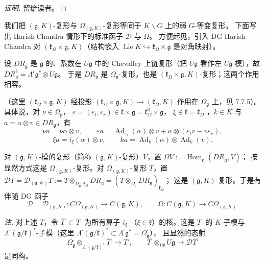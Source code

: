 \emph{证明.} 留给读者。\hfill$\Box$

 我们把 $(\mathfrak{g},K)$-复形与
$\Omega_{(\mathfrak{g},K)}$-复形等同于 $K\backslash G$ 上的弱 $G$-等变复形。
下面写出 Harish-Chandra 情形下的标准函子 $\mathcal{D}$ 与 $\Omega$。
方便起见，引入 DG Harish-Chandra 对
$(\mathfrak{k}_\Omega\times\mathfrak{g},K)$（结构嵌入
$\operatorname{Lie}K\hookrightarrow\mathfrak{k}_\Omega\times\mathfrak{g}$
是对角映射）。

设 $DR_{\mathfrak{g}}$ 是 $\mathfrak{g}$ 的、系数在 $U\mathfrak{g}$ 中的
Chevalley 上链复形（把 $U\mathfrak{g}$ 看作左 $U\mathfrak{g}$-模），故
$DR_{\mathfrak{g}}^i=\Lambda^i\mathfrak{g}^*\otimes U\mathfrak{g}$。
于是 $DR_{\mathfrak{g}}$ 是 $\Omega_{\mathfrak{g}}$-复形，也是
$(\mathfrak{k}_\Omega\times\mathfrak{g},K)$-复形；这两个作用相容。


（这里 $(\mathfrak{k}_\Omega\times\mathfrak{g},K)$ 经投影
$(\mathfrak{k}_\Omega\times\mathfrak{g},K)\to(\mathfrak{k}_\Omega,K)$
作用在 $\Omega_{\mathfrak{g}}$ 上，见 7.7.5）。具体说，对
$\nu\in\Omega_{\mathfrak{g}}$，
$\varepsilon=(\varepsilon_l,\varepsilon_r)\in\mathfrak{k}\times\mathfrak{g}
=\mathfrak{k}_\Omega^0\times\mathfrak{g}$，
$\xi\in\mathfrak{k}=\mathfrak{k}_\Omega^{-1}$，$k\in K$ 与
$a=\alpha\otimes v\in DR_{\mathfrak{g}}$，有
\[
\nu a=\nu\alpha\otimes v,\qquad
\varepsilon a=\operatorname{Ad}_{\varepsilon_l}(\alpha)\otimes v
+\alpha\otimes(\varepsilon_l v-v\varepsilon_r),
\]
\[
\xi a=i_\xi(\alpha)\otimes v,\qquad
ka=\operatorname{Ad}_k(\alpha)\otimes\operatorname{Ad}_k(v).
\]

对 $(\mathfrak{g},K)$-模的复形（简称 $(\mathfrak{g},K)$-复形）$V$，置
$\Omega V:=\operatorname{Hom}_{\mathfrak{g}}(DR_{\mathfrak{g}},V)$；
按显然方式这是 $\Omega_{(\mathfrak{g},K)}$-复形。对
$\Omega_{(\mathfrak{g},K)}$-复形 $T$，置
$\mathcal{D}T=\mathcal{D}_{(\mathfrak{g},K)}T:=
T\otimes_{\Omega_{\mathfrak{g}},\mathfrak{k}_\Omega}DR_{\mathfrak{g}}
=(T\otimes_{\Omega_{\mathfrak{g}}}DR_{\mathfrak{g}})_{\mathfrak{k}_\Omega}$；
这是 $(\mathfrak{g},K)$-复形。于是有伴随 DG 函子
\begin{equation}\tag{324}
\mathcal{D}=\mathcal{D}_{(\mathfrak{g},K)}:
C\Omega_{(\mathfrak{g},K)}\longrightarrow C(\mathfrak{g},K),\qquad
\Omega:C(\mathfrak{g},K)\longrightarrow C\Omega_{(\mathfrak{g},K)}.
\end{equation}

\emph{注.} 对上述 $T$，令
$\overline{T}^{\cdot}\subset T^{\cdot}$ 为所有算子 $i_\xi$
（$\xi\in\mathfrak{k}$）的核。这是 $T^{\cdot}$ 的 $K$-子模与
$\Lambda^{\cdot}(\mathfrak{g}/\mathfrak{k})^*$-子模（这里
$\Lambda^{\cdot}(\mathfrak{g}/\mathfrak{k})^*\subset
\Lambda^{\cdot}\mathfrak{g}^*=\Omega_{\mathfrak{g}}^{\cdot}$），
且显然的态射
\begin{equation}\tag{325}
\Omega_{\mathfrak{g}}^{\cdot}
\otimes_{\Lambda^{\cdot}(\mathfrak{g}/\mathfrak{k})^*}
\overline{T}^{\cdot}\longrightarrow T^{\cdot},\qquad
\overline{T}^{\cdot}\otimes_{U\mathfrak{k}}U\mathfrak{g}
\longrightarrow\mathcal{D}T^{\cdot}
\end{equation}
是同构。

